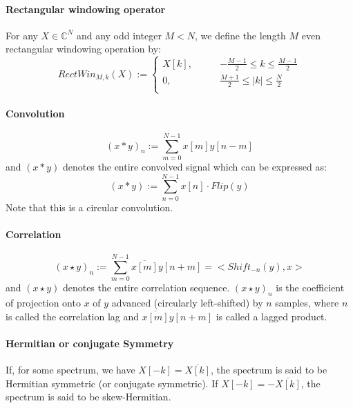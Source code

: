 \paragraph{Rectangular windowing operator}
For any $X \in \mathbb{C}^N$ and any odd integer $M<N$, we define the length $M$ even rectangular windowing operation by:
\begin{equation}
  RectWin_{M,k}(X) := 
  \begin{cases}
    X[k],   \qquad & -\frac{M-1}{2} \leq  k  \leq \frac{M-1}{2} \\
    0,      \qquad &  \frac{M+1}{2} \leq |k| \leq \frac{N}{2}   \\
  \end{cases}  
\end{equation}

\paragraph{Convolution}
\begin{equation}
  (x * y)_n := \sum_{m=0}^{N-1} x[m] y[n-m]
\end{equation}
and $(x * y)$ denotes the entire convolved signal which can be expressed as:
\begin{equation}
  (x * y) := \sum_{n=0}^{N-1} x[n] \cdot Flip(y)
\end{equation}
Note that this is a circular convolution.

\paragraph{Correlation}
\begin{equation}
  (x \star y)_n := \sum_{m=0}^{N-1} \overline{x[m]} y[n+m] = < Shift_{-n}(y), x >
\end{equation}
and $(x \star y)$ denotes the entire correlation sequence. $(x \star y)_n$ is the coefficient of projection onto $x$ of $y$ advanced (circularly left-shifted) by $n$ samples, where $n$ is called the correlation lag and $\overline{x[m]} y[n+m]$ is called a lagged product.

\paragraph{Hermitian or conjugate Symmetry}
If, for some spectrum, we have $X[-k] = \overline{X[k]}$, the spectrum is said to be Hermitian symmetric (or conjugate symmetric). If $X[-k] = -\overline{X[k]}$, the spectrum is said to be skew-Hermitian.

